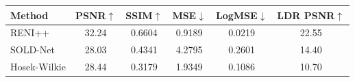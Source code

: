\begin{tabular}{l|ccccc}
\hline
Method & PSNR$\uparrow$ & SSIM$\uparrow$ & MSE$\downarrow$ & LogMSE$\downarrow$ & LDR PSNR$\uparrow$ \\
\hline
RENI++ & 32.24 & 0.6604 & 0.9189 & 0.0219 & 22.55 \\
SOLD-Net & 28.03 & 0.4341 & 4.2795 & 0.2601 & 14.40 \\
Hosek-Wilkie & 28.44 & 0.3179 & 1.9349 & 0.1086 & 10.70 \\
\hline
\end{tabular}